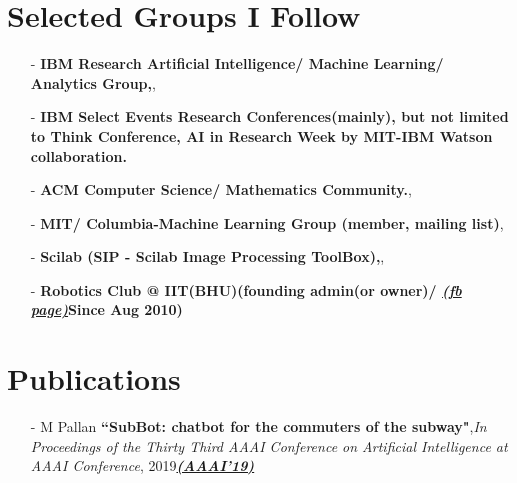 \documentclass[margin,line]{res}
\begin{document}
\begin{resume}

\section{\sc Selected Groups I Follow}
\begin{itemize}
	\item[-]{\bf IBM Research Artificial Intelligence/ Machine Learning/ Analytics Group,},
	\item[-]{\bf IBM Select Events Research Conferences(mainly), but not limited to Think Conference, AI in Research Week by  MIT-IBM Watson collaboration.}
	\item[-]{\bf ACM Computer Science/ Mathematics Community.},
	\item[-]{\bf MIT/ Columbia-Machine Learning Group (member, mailing list)},
	\item[-]{\bf Scilab (SIP - Scilab Image Processing ToolBox),},
	\item[-]{\bf Robotics Club @ IIT(BHU)(founding admin(or owner)/ {\bf \href{https://www.facebook.com/roboticsclubatiitbhu/}{\em(fb page)}}Since Aug 2010)} 
\end{itemize}

\section{\sc Publications}
\begin{itemize}
\item[-] M Pallan {\bf ``SubBot: chatbot for the commuters of the subway"},{\em In Proceedings of the Thirty Third AAAI Conference on Artificial Intelligence at AAAI Conference}, 2019{\bf \href{https://www.dropbox.com/sh/cpolg3mvrs4ekbj/AADgnuudz-ipIYR7kGZOMsTja?dl=0&preview=C1-DEEPDIAL19_paper_21.pdf}{\em (AAAI'19)}}


\end{itemize}
\end{resume}
\end{document}
